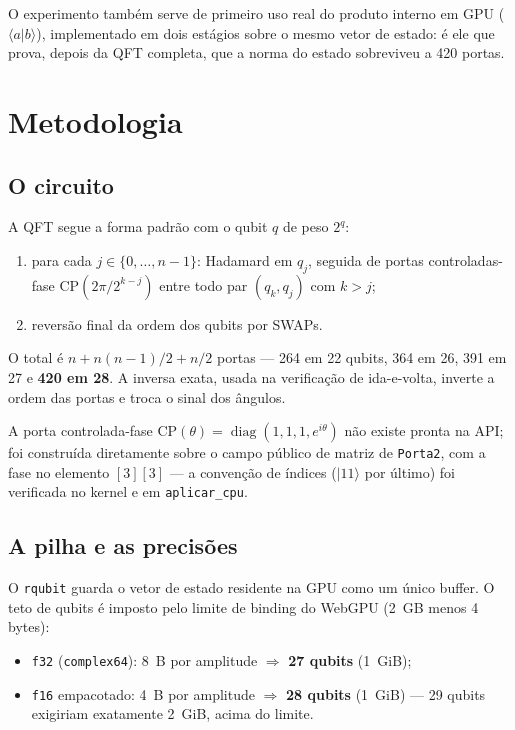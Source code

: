 \documentclass[11pt,a4paper]{article}
\begin{document}
O experimento também serve de primeiro uso real do produto interno em GPU
($\langle a|b\rangle$), implementado em dois estágios sobre o mesmo vetor de
estado: é ele que prova, depois da QFT completa, que a norma do estado sobreviveu
a 420 portas.

\section{Metodologia}

\subsection{O circuito}

A QFT segue a forma padrão com o qubit $q$ de peso $2^q$:
\begin{enumerate}
\item para cada $j \in \{0,\dots,n-1\}$: Hadamard em $q_j$, seguida de portas
  controladas-fase $\mathrm{CP}(2\pi/2^{k-j})$ entre todo par $(q_k, q_j)$ com
  $k > j$;
\item reversão final da ordem dos qubits por SWAPs.
\end{enumerate}
O total é $n + n(n-1)/2 + n/2$ portas --- 264 em 22 qubits, 364 em 26, 391 em
27 e \textbf{420 em 28}. A inversa exata, usada na verificação de ida-e-volta,
inverte a ordem das portas e troca o sinal dos ângulos.

A porta controlada-fase $\mathrm{CP}(\theta) = \operatorname{diag}(1,1,1,e^{i\theta})$
não existe pronta na API; foi construída diretamente sobre o campo público de
matriz de \texttt{Porta2}, com a fase no elemento $[3][3]$ --- a convenção de
índices ($|11\rangle$ por último) foi verificada no kernel e em
\texttt{aplicar\_cpu}.

\subsection{A pilha e as precisões}

O \texttt{rqubit} guarda o vetor de estado residente na GPU como um único
buffer. O teto de qubits é imposto pelo limite de binding do WebGPU (2~GB
menos 4 bytes):
\begin{itemize}
\item \texttt{f32} (\texttt{complex64}): 8~B por amplitude $\Rightarrow$
  \textbf{27 qubits} (1~GiB);
\item \texttt{f16} empacotado: 4~B por amplitude $\Rightarrow$ \textbf{28 qubits}
  (1~GiB) --- 29 qubits exigiriam exatamente 2~GiB, acima do limite.
\end{itemize}
\end{document}
